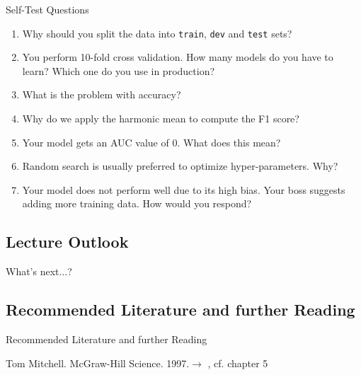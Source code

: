 \begin{frame}{Self-Test Questions}{}\important
	\begin{enumerate}
		\item Why should you split the data into \texttt{train}, \texttt{dev} and \texttt{test} sets?
		\item You perform 10-fold cross validation. How many models do you have to learn? Which one do you use in production?
		\item What is the problem with accuracy?
		\item Why do we apply the harmonic mean to compute the F1 score?
		\item Your model gets an AUC value of 0. What does this mean?
		\item Random search is usually preferred to optimize hyper-parameters. Why?
		\item Your model does not perform well due to its high bias.
			Your boss suggests adding more training data. How would you respond?
	\end{enumerate}
\end{frame}


\subsection{Lecture Outlook}

\begin{frame}{What's next...?}{}
\end{frame}


\subsection{Recommended Literature and further Reading}

\begin{frame}[allowframebreaks]{Recommended Literature and further Reading}{}
	\footnotesize
	\begin{thebibliography}{2}
			{Tom Mitchell. McGraw-Hill Science. 1997.}{$\rightarrow$ \href{
				https://www.cs.ubbcluj.ro/~gabis/ml/ml-books/McGrawHill\%20-\%20Machine\%20Learning\%20-Tom\%20Mitchell.pdf
			}{}, cf. chapter 5}
	\end{thebibliography}
\end{frame}


